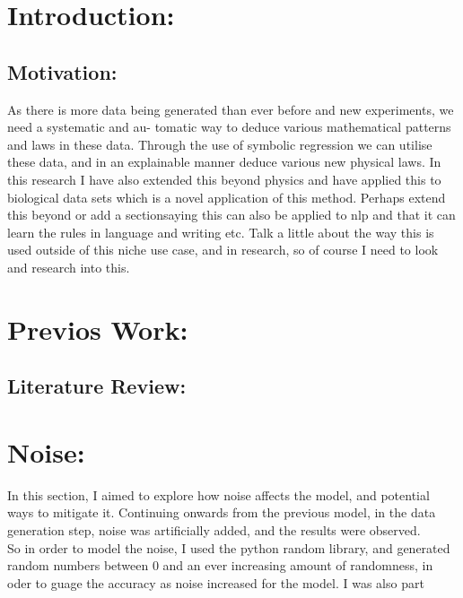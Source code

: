 \documentclass{article}
\begin{document}
\newpage

\tableofcontents 

\newpage
{}



\section{Introduction: }

\subsection{Motivation: }

As there is more data being generated than ever before and new experiments, we need a systematic and au-
tomatic way to deduce various mathematical patterns and laws in these data. Through the use of symbolic
regression we can utilise these data, and in an explainable manner deduce various new physical laws. In this
research I have also extended this beyond physics and have applied this to biological data sets which is a novel
application of this method. Perhaps extend this beyond or add a sectionsaying this can also be applied to nlp
and that it can learn the rules in language and writing etc.
Talk a little about the way this is used outside of this niche use case, and in research, so of course I need to look
and research into this.\\

\section{Previos Work: }

\subsection{Literature Review: }

\section{Noise: }

In this section, I aimed to explore how noise affects the model, and potential ways to mitigate it. Continuing
onwards from the previous model, in the data generation step, noise was artificially added, and the results were
observed.\\

So in order to model the noise, I used the python random library, and generated random numbers between 0 and
an ever increasing amount of randomness, in oder to guage the accuracy as noise increased for the model. I was
also part\\
\end{document}
